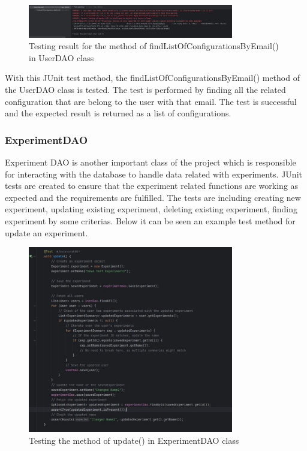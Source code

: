 \begin{figure}[ht!]
    \centering
    \includegraphics[width=0.8\textwidth]{images/5_testing/userdao-test-result}
    \caption{Testing result for the method of findListOfConfigurationsByEmail() in UserDAO class}
    \label{fig:u_dao_test_result}
\end{figure}

With this JUnit test method, the findListOfConfigurationsByEmail() method of the UserDAO class is tested. The test is performed by finding all the related configuration that are belong to the user with that email.
The test is successful and the expected result is returned as a list of configurations.

\newpage
\subsubsection{ExperimentDAO}
Experiment DAO is another important class of the project which is responsible for interacting with the database to handle data related with experiments. JUnit tests are created to ensure that the experiment related functions are
working as expected and the requirements are fulfilled. The tests are including creating new experiment, updating existing experiment, deleting existing experiment, finding experiment by some criterias. Below it can be seen an example test method for update an experiment.

\begin{figure}[ht!]
    \centering
    \includegraphics[width=0.8\textwidth]{images/5_testing/experimentdao-test}
    \caption{Testing the method of update() in ExperimentDAO class}
    \label{fig:e_dao_test}
\end{figure}

